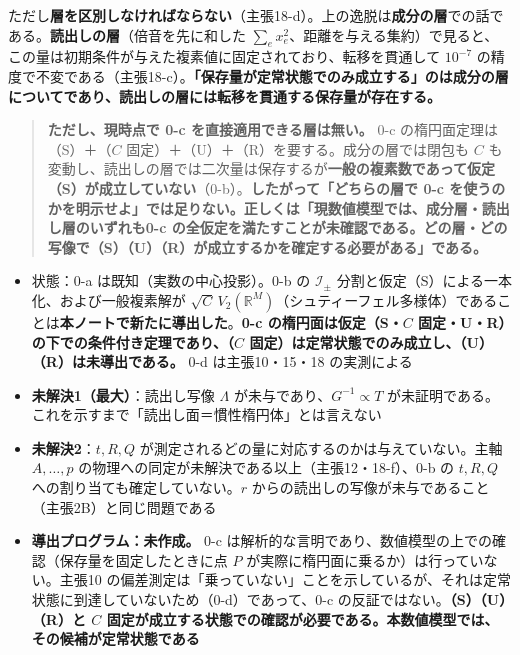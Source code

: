 \documentclass[
  10pt,
]{ltjsarticle}
\providecommand{\tightlist}{%
  \setlength{\itemsep}{0pt}\setlength{\parskip}{0pt}}
\begin{document}
ただし\textbf{層を区別しなければならない}（主張18-d）。上の逸脱は\textbf{成分の層}での話である。\textbf{読出しの層}（倍音を先に和した
\(\sum_e x_e^2\)、距離を与える集約）で見ると、この量は初期条件が与えた複素値に固定されており、転移を貫通して
\(10^{-7}\)
の精度で不変である（主張18-c）。\textbf{「保存量が定常状態でのみ成立する」のは成分の層についてであり、読出しの層には転移を貫通する保存量が存在する。}

\begin{quote}
\textbf{ただし、現時点で 0-c を直接適用できる層は無い。} 0-c
の楕円面定理は（S）＋（\(C\)
固定）＋（U）＋（R）を要する。成分の層では閉包も \(C\)
も変動し、読出しの層では二次量は保存するが\textbf{一般の複素数であって仮定（S）が成立していない}（0-b）。\textbf{したがって「どちらの層で
0-c
を使うのかを明示せよ」では足りない。正しくは「現数値模型では、成分層・読出し層のいずれも0-c
の全仮定を満たすことが未確認である。どの層・どの写像で（S）（U）（R）が成立するかを確定する必要がある」である。}
\end{quote}

\begin{itemize}
\tightlist
\item
  状態：0-a は既知（実数の中心投影）。0-b の \(\mathcal{I}_\pm\)
  分割と仮定（S）による一本化、および一般複素解が
  \(\sqrt{C}\,V_2(\mathbb{R}^M)\)（シュティーフェル多様体）であることは\textbf{本ノートで新たに導出した}。\textbf{0-c
  の楕円面は仮定（S・\(C\)
  固定・U・R）の下での条件付き定理であり、（\(C\)
  固定）は定常状態でのみ成立し、（U）（R）は未導出である。} 0-d
  は主張10・15・18 の実測による
\item
  \textbf{未解決1（最大）}：読出し写像 \(\Lambda\)
  が未与であり、\(G^{-1}\propto T\)
  が未証明である。これを示すまで「読出し面＝慣性楕円体」とは言えない
\item
  \textbf{未解決2}：\(t, R, Q\)
  が測定されるどの量に対応するのかは与えていない。主軸 \(A,\dots,p\)
  の物理への同定が未解決である以上（主張12・18-f）、0-b の \(t, R, Q\)
  への割り当ても確定していない。\(r\)
  からの読出しの写像が未与であること（主張2B）と同じ問題である
\item
  \textbf{導出プログラム：未作成。} 0-c
  は解析的な言明であり、数値模型の上での確認（保存量を固定したときに点
  \(P\) が実際に楕円面に乗るか）は行っていない。主張10
  の偏差測定は「乗っていない」ことを示しているが、それは定常状態に到達していないため（0-d）であって、0-c
  の反証ではない。\textbf{（S）（U）（R）と \(C\)
  固定が成立する状態での確認が必要である。本数値模型では、その候補が定常状態である}
\end{itemize}
\end{document}
